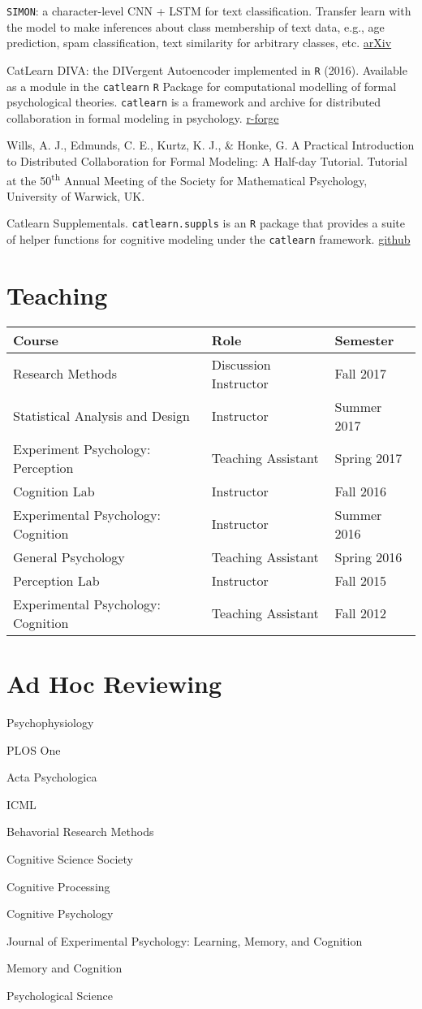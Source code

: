 \documentclass[11pt,]{article}
\begin{document}
\texttt{SIMON}: a character-level CNN + LSTM for text classification.
Transfer learn with the model to make inferences about class membership
of text data, e.g., age prediction, spam classification, text similarity
for arbitrary classes, etc.
\href{https://arxiv.org/abs/1901.08456}{arXiv}

CatLearn DIVA: the DIVergent Autoencoder implemented in \texttt{R}
(2016). Available as a module in the \texttt{catlearn} \texttt{R}
Package for computational modelling of formal psychological theories.
\texttt{catlearn} is a framework and archive for distributed
collaboration in formal modeling in psychology.
\href{http://catlearn.r-forge.r-project.org}{r-forge}

Wills, A. J., Edmunds, C. E., Kurtz, K. J., \& Honke, G. A Practical
Introduction to Distributed Collaboration for Formal Modeling: A
Half-day Tutorial. Tutorial at the 50\textsuperscript{th} Annual Meeting
of the Society for Mathematical Psychology, University of Warwick, UK.

Catlearn Supplementals. \texttt{catlearn.suppls} is an \texttt{R}
package that provides a suite of helper functions for cognitive modeling
under the \texttt{catlearn} framework.
\href{http://www.github.com/ghonk/catlearn.suppls}{github}

\section{Teaching}\label{teaching}

\begin{longtable}[]{@{}lll@{}}
\toprule
Course & Role & Semester\tabularnewline
\midrule
\endhead
Research Methods & Discussion Instructor & Fall 2017\tabularnewline
Statistical Analysis and Design & Instructor & Summer
2017\tabularnewline
Experiment Psychology: Perception & Teaching Assistant & Spring
2017\tabularnewline
Cognition Lab & Instructor & Fall 2016\tabularnewline
Experimental Psychology: Cognition & Instructor & Summer
2016\tabularnewline
General Psychology & Teaching Assistant & Spring 2016\tabularnewline
Perception Lab & Instructor & Fall 2015\tabularnewline
Experimental Psychology: Cognition & Teaching Assistant & Fall
2012\tabularnewline
\bottomrule
\end{longtable}

\section{Ad Hoc Reviewing}\label{ad-hoc-reviewing}

Psychophysiology

PLOS One

Acta Psychologica

ICML

Behavorial Research Methods

Cognitive Science Society

Cognitive Processing

Cognitive Psychology

Journal of Experimental Psychology: Learning, Memory, and Cognition

Memory and Cognition

Psychological Science
\end{document}

